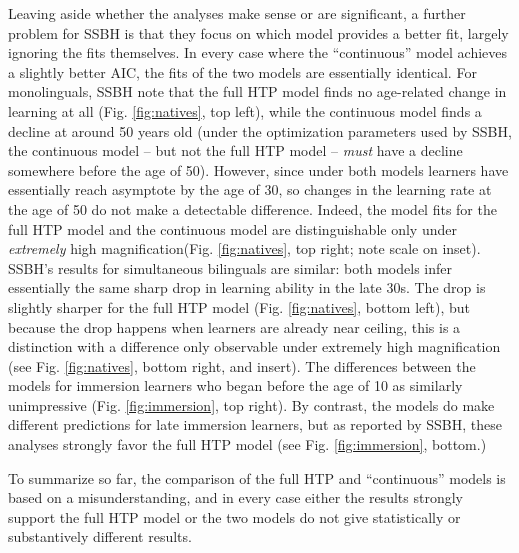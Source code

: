 \documentclass[
  english,
  doc,floatsintext]{apa6}
\begin{document}
Leaving aside whether the analyses make sense or are significant, a further problem for SSBH is that they focus on which model provides a better fit, largely ignoring the fits themselves. In every case where the ``continuous'' model achieves a slightly better AIC, the fits of the two models are essentially identical. For monolinguals, SSBH note that the full HTP model finds no age-related change in learning at all (Fig. \ref{fig:natives}, top left), while the continuous model finds a decline at around 50 years old (under the optimization parameters used by SSBH, the continuous model -- but not the full HTP model -- \emph{must} have a decline somewhere before the age of 50). However, since under both models learners have essentially reach asymptote by the age of 30, so changes in the learning rate at the age of 50 do not make a detectable difference. Indeed, the model fits for the full HTP model and the continuous model are distinguishable only under \emph{extremely} high magnification(Fig. \ref{fig:natives}, top right; note scale on inset). SSBH's results for simultaneous bilinguals are similar: both models infer essentially the same sharp drop in learning ability in the late 30s. The drop is slightly sharper for the full HTP model (Fig. \ref{fig:natives}, bottom left), but because the drop happens when learners are already near ceiling, this is a distinction with a difference only observable under extremely high magnification (see Fig. \ref{fig:natives}, bottom right, and insert). The differences between the models for immersion learners who began before the age of 10 as similarly unimpressive (Fig. \ref{fig:immersion}, top right). By contrast, the models do make different predictions for late immersion learners, but as reported by SSBH, these analyses strongly favor the full HTP model (see Fig. \ref{fig:immersion}, bottom.)

To summarize so far, the comparison of the full HTP and ``continuous'' models is based on a misunderstanding, and in every case either the results strongly support the full HTP model or the two models do not give statistically or substantively different results.
\end{document}
